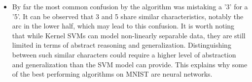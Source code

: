 \documentclass[a4paper]{article}
\begin{document}
\begin{itemize}
  \item By far the most common confusion by the algorithm was mistaking a '3' for a '5'.  It can be observed that 3 and 5 share similar characteristics, notably the arc in the lower half, which may lead to this confusion.  It is worth noting that while Kernel SVMs can model non-linearly separable data, they are still limited in terms of abstract reasoning and generalization.  Distinguishing between such similar characters could require a higher level of abstraction and generalization than the SVM model can provide.  This explains why some of the best performing algorithms on MNIST are neural networks.
\end{itemize}
\end{document}
